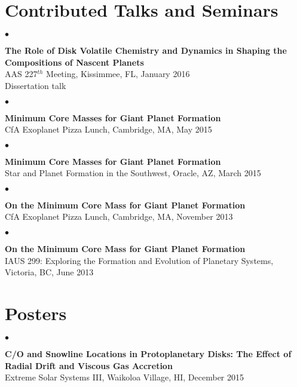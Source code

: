 \documentclass[margin,line]{res}
\newenvironment{list2}{
  \begin{list}{$\bullet$}{%
      \setlength{\itemsep}{0in}
      \setlength{\parsep}{0in} \setlength{\parskip}{0in}
      \setlength{\topsep}{0in} \setlength{\partopsep}{0in} 
      \setlength{\leftmargin}{0.2in}}}{\end{list}}
\begin{document}
\begin{resume}
\section{\sc Contributed Talks and Seminars}

\begin{list2}
\item[] {\bf The Role of Disk Volatile Chemistry and Dynamics in Shaping the Compositions of Nascent Planets} \\
AAS 227$^{th}$ Meeting, Kissimmee, FL, January 2016\\
Dissertation talk \\
\end{list2}

\begin{list2}
\item[] {\bf Minimum Core Masses for Giant Planet Formation} \\
CfA Exoplanet Pizza Lunch, Cambridge, MA, May 2015  \\
\end{list2}

\begin{list2}
\item[] {\bf Minimum Core Masses for Giant Planet Formation} \\
Star and Planet Formation in the Southwest, Oracle, AZ, March 2015  \\
\end{list2}

\begin{list2}
\item[] {\bf On the Minimum Core Mass for Giant Planet Formation} \\
CfA Exoplanet Pizza Lunch, Cambridge, MA, November 2013  \\
\end{list2}

\begin{list2}
\item[] {\bf On the Minimum Core Mass for Giant Planet Formation} \\
IAUS 299: Exploring the Formation and Evolution of Planetary Systems, Victoria, BC, June 2013  \\
\end{list2}


\section{\sc Posters}

\begin{list2}
\item[] {\bf C/O and Snowline Locations in Protoplanetary Disks: The Effect of Radial Drift and Viscous Gas Accretion} \\
Extreme Solar Systems III, Waikoloa Village, HI, December 2015 \\
\end{list2}



\end{resume}
\end{document}
